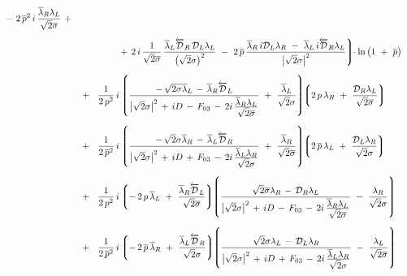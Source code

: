 \documentclass[epsfig,12pt]{article}
\newcommand{\ov}{\overline}
\newcommand{\md}{\mathcal{D}}
\newcommand{\lgr}{\left\lgroup}
\newcommand{\rgr}{\right\rgroup}
\begin{document}
\begin{align}
				~-~  2\, \ov p{}^2\, i\, \frac{\ov\lambda{}_R \lambda_L}{\sqrt{2}\ov\sigma}  ~+~
	\\[2mm]
%
\notag
	&
		\phantom{~~+~~  \frac{1}{2\, \ov p{}^3} \Bigg\lgroup}
				+\, 2\, i\, \frac{1}{\sqrt{2}\ov\sigma}\,
					\frac{\ov\lambda{}_L \overleftarrow{\md}_R\, \md_L\lambda_L}{\big(\sqrt{2}\sigma\big)^2}
				~-~  2\, \ov p\,
					\frac{\ov\lambda{}_R\, i\md_L \lambda_R ~-~ \ov\lambda{}_L\, i\overleftarrow{\md}_R \lambda_L}{\big|\sqrt{2}\sigma\big|^2}
			\Bigg\rgroup\!\!
		\cdot \ln \big( 1 ~+~ \ov p \big)
	\\[2mm]
%
\notag
	&
		~~+~~  \frac{1}{2\, p^2}\, i
		\lgr
			\frac{
				-\, \sqrt{2}\ov{\sigma\lambda}{}_L 
				\,-\, \ov\lambda{}_R \overleftarrow{\md}_L
			}
			{
				\big|\sqrt{2}\sigma\big|^2 \,+\, iD \,-\, F_{03} 
				\,-\, 2i\,\frac{\displaystyle \ov\lambda{}_R\lambda_L}{\displaystyle \sqrt{2}\ov\sigma}
			}
			~+~
			\frac{\ov\lambda{}_L}{\sqrt{2}\sigma}
		\rgr
		\!\!
		\lgr
			2\,p\,\lambda_R
			~+~
			\frac{\md_R \lambda_L}{\sqrt{2}\ov\sigma}
		\rgr
	\\[2mm]
%
\notag
	&
		~~+~~  \frac{1}{2\, \ov p{}^2}\, i
		\lgr
			\frac{
				-\, \sqrt{2}\sigma\ov\lambda{}_R
				\,-\, \ov\lambda{}_L \overleftarrow{\md}_R
			}
			{
				\big|\sqrt{2}\sigma\big|^2 \,+\, iD \,+\, F_{03} 
				\,-\, 2i\,\frac{\displaystyle \ov\lambda{}_L\lambda_R}{\displaystyle \sqrt{2}\sigma}
			}
			~+~
			\frac{\ov\lambda{}_R}{\sqrt{2}\ov\sigma}
		\rgr
		\!\!
		\lgr
			2\, \ov p\, \lambda_L
			~+~
			\frac{\md_L \lambda_R}{\sqrt{2}\sigma}
		\rgr
	\\[2mm]
%
\notag
	&
		~~+~~  \frac{1}{2\, p^2}\, i
		\lgr
			-\, 2\, p\, \ov\lambda{}_L
			~+~
			\frac{\ov\lambda{}_R \overleftarrow{\md}_L}{\sqrt{2}\ov\sigma}
		\rgr
		\!\!
		\lgr
			\frac{
				\sqrt{2}\ov\sigma\lambda_R
				\,-\, \md_R \lambda_L
			}
			{
				\big|\sqrt{2}\sigma\big|^2 \,+\, iD \,-\, F_{03} 
				\,-\, 2i\,\frac{\displaystyle \ov\lambda{}_R\lambda_L}{\displaystyle \sqrt{2}\ov\sigma}
			}
			~-~
			\frac{\lambda_R}{\sqrt{2}\sigma}
		\rgr
	\\[2mm]
%
\notag
	&
		~~+~~  \frac{1}{2\, \ov p{}^2}\, i
		\lgr
			-\, 2\, \ov p\, \ov\lambda{}_R
			~+~
			\frac{\ov\lambda{}_L \overleftarrow{\md}_R}{\sqrt{2}\sigma}
		\rgr
		\!\!
		\lgr
			\frac{
				\sqrt{2}\sigma\lambda_L
				\,-\, \md_L\lambda_R
			}
			{
				\big|\sqrt{2}\sigma\big|^2 \,+\, iD \,+\, F_{03} 
				\,-\, 2i\,\frac{\displaystyle \ov\lambda{}_L\lambda_R}{\displaystyle \sqrt{2}\sigma}
			}
			~-~
			\frac{\lambda_L}{\sqrt{2}\ov\sigma}
		\rgr
	\\[2mm]

\end{align}
\end{document}
